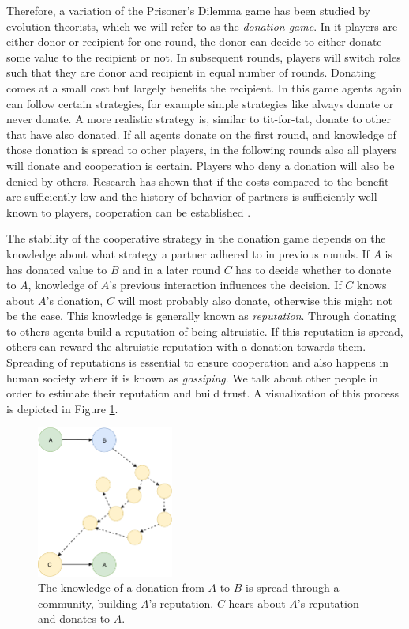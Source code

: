 Therefore, a variation of the Prisoner's Dilemma game has been studied by evolution theorists, which
we will refer to as the \textit{donation game}. In it players are either donor or recipient for one round, the donor can decide to either donate
some value to the recipient or not. In subsequent rounds, players will switch roles such that they
are donor and recipient in equal number of rounds. Donating comes at a small cost but largely benefits the recipient.
In this game agents again can follow certain strategies, for example simple strategies like always donate or never
donate. A more realistic strategy is, similar to tit-for-tat, donate to other that have also donated.
If all agents donate on the first round, and knowledge of those donation is spread to other players, 
in the following rounds also all players will donate and cooperation is certain. Players who deny a
donation will also be denied by others.
Research has shown that if the costs compared to the benefit are sufficiently low and the history of
behavior of partners is sufficiently well-known to players, cooperation can be established \cite{nowak2005evolution}.

The stability of the cooperative strategy in the donation game depends on the knowledge about what strategy
a partner adhered to in previous rounds. If $A$ is has donated value to $B$ and in a later round 
$C$ has to decide whether to donate to $A$, knowledge of $A$'s previous interaction influences the 
decision. If $C$ knows about $A$'s donation, $C$ will most probably also donate, otherwise this might
not be the case. This knowledge is generally known as \textit{reputation}. Through donating to others
agents build a reputation of being altruistic. If this reputation is spread, others can reward the
altruistic reputation with a donation towards them. Spreading of reputations is essential to ensure
cooperation and also happens in human society where it is known as \textit{gossiping}. We talk about
other people in order to estimate their reputation and build trust. A visualization of this process 
is depicted in Figure \ref{fig:reputation_building}. 

\begin{figure}
    \centering
    \includegraphics[width=0.4\textwidth]{images/reputation_building.pdf}
    \caption{The knowledge of a donation from $A$ to $B$ is spread through a community, building $A$'s
    reputation. $C$ hears about $A$'s reputation and donates to $A$.}
    \label{fig:reputation_building}
\end{figure}


